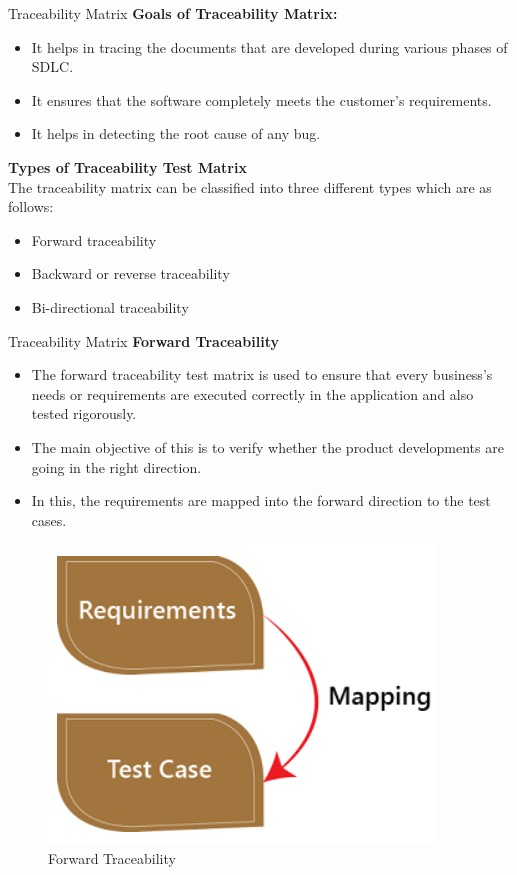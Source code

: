 \documentclass{beamer}
\begin{document}
\begin{frame}{Traceability Matrix}
	\textbf{Goals of Traceability Matrix:}
	\begin{itemize}
		\item It helps in tracing the documents that are developed during various phases of SDLC.
		\item It ensures that the software completely meets the customer's requirements.
		\item It helps in detecting the root cause of any bug.
	\end{itemize}
	\textbf{Types of Traceability Test Matrix}\\
The traceability matrix can be classified into three different types which are as follows:
\begin{itemize}
	\item Forward traceability
	\item Backward or reverse traceability
	\item Bi-directional traceability
\end{itemize}
\end{frame}
\begin{frame}{Traceability Matrix}
	\textbf{Forward Traceability }
	\begin{itemize}
		\item The forward traceability test matrix is used to ensure that every business's needs or requirements are executed correctly in the application and also tested rigorously. 
		\item The main objective of this is to verify whether the product developments are going in the right direction. 
		\item In this, the requirements are mapped into the forward direction to the test cases.
	\end{itemize}
\begin{figure}
	\includegraphics[scale=.5]{img/m2_13.jpg}
	\caption{Forward Traceability}
\end{figure}
\end{frame}
\end{document}
